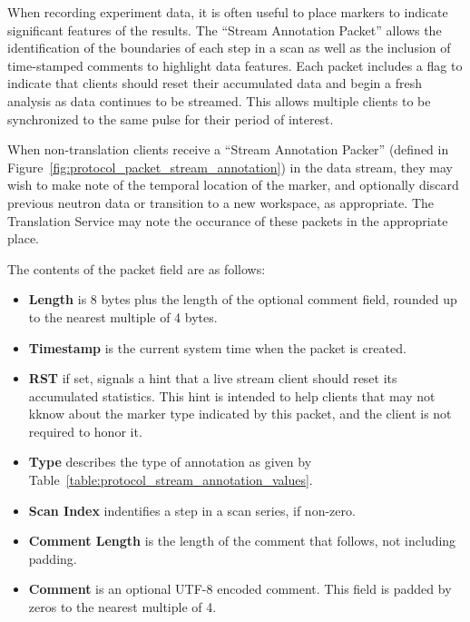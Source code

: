 When recording experiment data, it is often useful to place markers to indicate
significant features of the results. The ``Stream Annotation Packet'' allows
the identification of the boundaries of each step in a scan as well as the
inclusion of time-stamped comments to highlight data features. Each packet
includes a flag to indicate that clients should reset their accumulated data
and begin a fresh analysis as data continues to be streamed. This allows
multiple clients to be synchronized to the same pulse for their period of
interest.

When non-translation clients receive a ``Stream Annotation Packer'' (defined in
Figure~\ref{fig:protocol_packet_stream_annotation}) in the data stream, they
may wish to make note of the temporal location of the marker, and optionally
discard previous neutron data or transition to a new workspace, as appropriate.
The Translation Service may note the occurance of these packets in the
appropriate place.

The contents of the packet field are as follows:
\begin{itemize}
\item{\bf Length} is 8 bytes plus the length of the optional comment field,
rounded up to the nearest multiple of 4 bytes.
\item{\bf Timestamp} is the current system time when the packet is created.
\item{\bf RST} if set, signals a hint that a live stream client should reset
its accumulated statistics. This hint is intended to help clients that may not
kknow about the marker type indicated by this packet, and the client is not
required to honor it.
\item{\bf Type} describes the type of annotation as given by
Table~\ref{table:protocol_stream_annotation_values}.
\item{\bf Scan Index} indentifies a step in a scan series, if non-zero.
\item{\bf Comment Length} is the length of the comment that follows, not
including padding.
\item{\bf Comment} is an optional UTF-8 encoded comment.  This field is padded
by zeros to the nearest multiple of 4.
\end{itemize}

